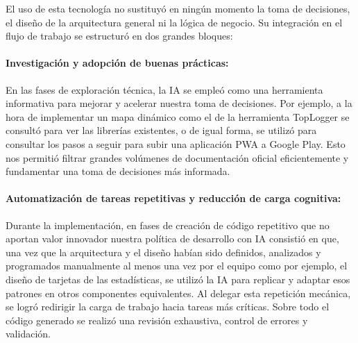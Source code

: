 El uso de esta tecnología no sustituyó en ningún momento la toma de decisiones, el diseño de la arquitectura general ni la lógica de negocio. Su integración en el flujo de trabajo se estructuró en dos grandes bloques:

\paragraph{Investigación y adopción de buenas prácticas:} En las fases de exploración técnica, la IA se empleó como una herramienta informativa para mejorar y acelerar nuestra toma de decisiones. Por ejemplo, a la hora de implementar un mapa dinámico como el de la herramienta TopLogger se consultó para ver las librerías existentes, o de igual forma, se utilizó para consultar los pasos a seguir para subir una aplicación PWA a Google Play. Esto nos permitió filtrar grandes volúmenes de documentación oficial eficientemente y fundamentar una toma de decisiones más informada.

\paragraph{Automatización de tareas repetitivas y reducción de carga cognitiva:} Durante la implementación, en fases de creación de código repetitivo que no aportan valor innovador nuestra política de desarrollo con IA consistió en que, una vez que la arquitectura y el diseño habían sido definidos, analizados y programados manualmente al menos una vez por el equipo como por ejemplo, el diseño de tarjetas de las estadísticas, se utilizó la IA para replicar y adaptar esos patrones en otros componentes equivalentes. Al delegar esta repetición mecánica, se logró redirigir la carga de trabajo hacia tareas más críticas. Sobre todo el código generado se realizó una revisión exhaustiva, control de errores y validación.